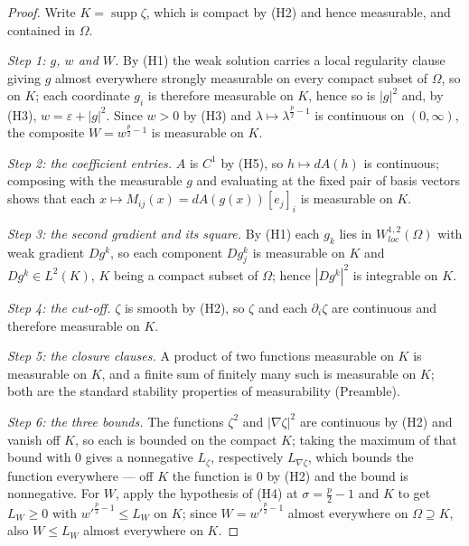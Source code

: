 \begin{proof}
Write $K=\operatorname{supp}\zeta$, which is compact by (H2) and hence
measurable, and contained in $\Omega$.

\emph{Step 1: $g$, $w$ and $W$.}  By (H1) the weak solution carries a local
regularity clause giving $g$ almost everywhere strongly measurable on every
compact subset of $\Omega$, so on $K$; each coordinate $g_i$ is therefore
measurable on $K$, hence so is $|g|^2$ and, by (H3), $w=\varepsilon+|g|^2$.
Since $w>0$ by (H3) and $\lambda\mapsto\lambda^{\frac p2-1}$ is continuous on
$(0,\infty)$, the composite $W=w^{\frac p2-1}$ is measurable on $K$.

\emph{Step 2: the coefficient entries.}  $A$ is $C^1$ by (H5), so
$h\mapsto dA(h)$ is continuous; composing with the measurable $g$ and
evaluating at the fixed pair of basis vectors shows that each
$x\mapsto M_{ij}(x)=dA(g(x))[e_j]_i$ is measurable on $K$.

\emph{Step 3: the second gradient and its square.}  By (H1) each $g_k$ lies in
$W^{1,2}_{loc}(\Omega)$ with weak gradient $Dg^k$, so each component $Dg^k_j$
is measurable on $K$ and $Dg^k\in L^2(K)$, $K$ being a compact subset of
$\Omega$; hence $|Dg^k|^2$ is integrable on $K$.

\emph{Step 4: the cut-off.}  $\zeta$ is smooth by (H2), so $\zeta$ and each
$\partial_i\zeta$ are continuous and therefore measurable on $K$.

\emph{Step 5: the closure clauses.}  A product of two functions measurable on
$K$ is measurable on $K$, and a finite sum of finitely many such is measurable
on $K$; both are the standard stability properties of measurability
(Preamble).

\emph{Step 6: the three bounds.}  The functions $\zeta^2$ and
$|\nabla\zeta|^2$ are continuous by (H2) and vanish off $K$, so each is bounded
on the compact $K$; taking the maximum of that bound with $0$ gives a
nonnegative $L_\zeta$, respectively $L_{\nabla\zeta}$, which bounds the
function everywhere --- off $K$ the function is $0$ by (H2) and the bound is
nonnegative.  For $W$, apply the hypothesis of (H4) at $\sigma=\frac p2-1$ and
$K$ to get $L_W\ge0$ with $w'^{\frac p2-1}\le L_W$ on $K$; since
$W=w'^{\frac p2-1}$ almost everywhere on $\Omega\supseteq K$, also $W\le L_W$
almost everywhere on $K$.
\end{proof}
